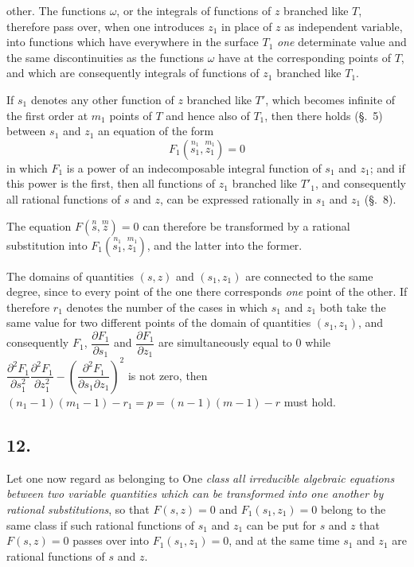 \documentclass{article}
\begin{document}
other. The functions $\omega$, or the integrals of functions of $z$ branched like $T$, therefore pass over, when one introduces $z_{1}$ in place of $z$ as independent variable, into functions which have everywhere in the surface $T_{1}$ \emph{one} determinate value and the same discontinuities as the functions $\omega$ have at the corresponding points of $T$, and which are consequently integrals of functions of $z_{1}$ branched like $T_{1}$.

If $s_{1}$ denotes any other function of $z$ branched like $T'$, which becomes infinite of the first order at $m_{1}$ points of $T$ and hence also of $T_{1}$, then there holds (§.~5) between $s_{1}$ and $z_{1}$ an equation of the form
\[ F_{1}(\overset{n_{1}}{s_{1}}, \overset{m_{1}}{z_{1}}) = 0 \]
in which $F_{1}$ is a power of an indecomposable integral function of $s_{1}$ and $z_{1}$; and if this power is the first, then all functions of $z_{1}$ branched like $T'_{1}$, and consequently all rational functions of $s$ and $z$, can be expressed rationally in $s_{1}$ and $z_{1}$ (§.~8).

The equation $F(\overset{n}{s}, \overset{m}{z}) = 0$ can therefore be transformed by a rational substitution into $F_{1}(\overset{n_{1}}{s_{1}}, \overset{m_{1}}{z_{1}})$, and the latter into the former.

The domains of quantities $(s, z)$ and $(s_{1}, z_{1})$ are connected to the same degree, since to every point of the one there corresponds \emph{one} point of the other. If therefore $r_{1}$ denotes the number of the cases in which $s_{1}$ and $z_{1}$ both take the same value for two different points of the domain of quantities $(s_{1}, z_{1})$, and consequently $F_{1}$, $\dfrac{\partial F_{1}}{\partial s_{1}}$ and $\dfrac{\partial F_{1}}{\partial z_{1}}$ are simultaneously equal to 0 while $\dfrac{\partial^{2}F_{1}}{\partial s_{1}^{2}} \dfrac{\partial^{2}F_{1}}{\partial z_{1}^{2}} - \left(\dfrac{\partial^{2}F_{1}}{\partial s_{1} \partial z_{1}}\right)^{2}$ is not zero, then $(n_{1}-1)(m_{1}-1) - r_{1} = p = (n-1)(m-1) - r$ must hold.

\subsection*{12.}

Let one now regard as belonging to One \emph{class} \emph{all irreducible algebraic equations between two variable quantities which can be transformed into one another by rational substitutions}, so that $F(s, z) = 0$ and $F_{1}(s_{1}, z_{1}) = 0$ belong to the same class if such rational functions of $s_{1}$ and $z_{1}$ can be put for $s$ and $z$ that $F(s, z) = 0$ passes over into $F_{1}(s_{1}, z_{1}) = 0$, and at the same time $s_{1}$ and $z_{1}$ are rational functions of $s$ and $z$.
\end{document}
